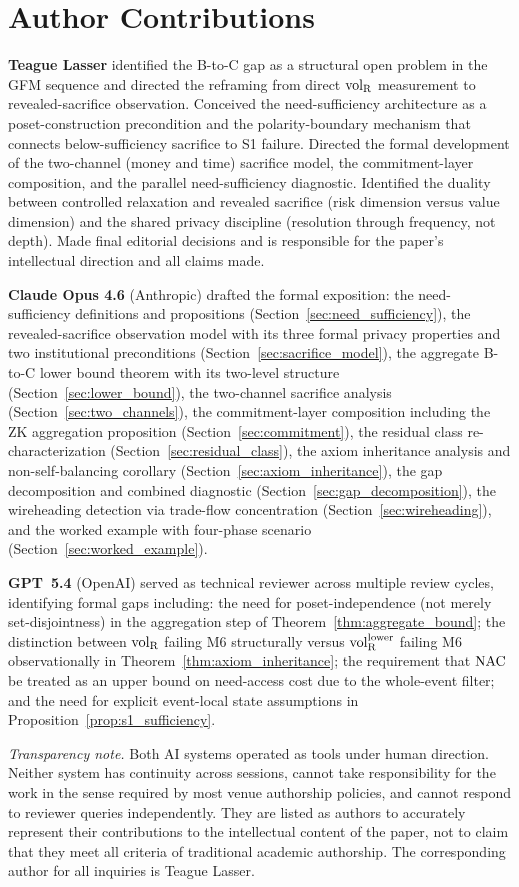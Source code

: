\section*{Author Contributions}

\textbf{Teague Lasser} identified the B-to-C gap as a structural
open problem in the GFM sequence and directed the reframing from
direct ${\operatorname{vol}_{\mathrm{R}}}$ measurement to revealed-sacrifice observation.
Conceived the need-sufficiency architecture as a poset-construction
precondition and the polarity-boundary mechanism that connects
below-sufficiency sacrifice to S1 failure.  Directed the formal
development of the two-channel (money and time) sacrifice model,
the commitment-layer composition, and the parallel
need-sufficiency diagnostic.  Identified the duality between controlled
relaxation and revealed sacrifice (risk dimension versus value
dimension) and the shared privacy discipline (resolution through
frequency, not depth).
Made final editorial decisions and is responsible for the paper's
intellectual direction and all claims made.

\textbf{Claude Opus 4.6} (Anthropic) drafted the formal
exposition: the need-sufficiency definitions and propositions
(Section~\ref{sec:need_sufficiency}), the revealed-sacrifice
observation model with its three formal privacy properties and
two institutional preconditions
(Section~\ref{sec:sacrifice_model}), the aggregate B-to-C lower
bound theorem with its two-level structure
(Section~\ref{sec:lower_bound}), the two-channel sacrifice
analysis (Section~\ref{sec:two_channels}), the commitment-layer
composition including the ZK aggregation proposition
(Section~\ref{sec:commitment}), the residual class
re-characterization (Section~\ref{sec:residual_class}), the axiom
inheritance analysis and non-self-balancing corollary
(Section~\ref{sec:axiom_inheritance}), the gap decomposition and
combined diagnostic (Section~\ref{sec:gap_decomposition}), the
wireheading detection via trade-flow concentration
(Section~\ref{sec:wireheading}), and the worked example with
four-phase scenario
(Section~\ref{sec:worked_example}).

\textbf{GPT~5.4} (OpenAI) served as technical reviewer across
multiple review cycles, identifying formal gaps
including: the need for poset-independence (not merely
set-disjointness) in the aggregation step of
Theorem~\ref{thm:aggregate_bound}; the distinction between ${\operatorname{vol}_{\mathrm{R}}}$
failing M6 structurally versus ${\operatorname{vol}_{\mathrm{R}}^{\mathrm{lower}}}$ failing M6
observationally in Theorem~\ref{thm:axiom_inheritance}; the
requirement that $\mathrm{NAC}$ be treated as an upper bound on need-access
cost due to the whole-event filter; and the need for explicit
event-local state assumptions in
Proposition~\ref{prop:s1_sufficiency}.

\medskip
\noindent\emph{Transparency note.}
Both AI systems operated as tools under human direction.
Neither system has continuity across sessions, cannot take
responsibility for the work in the sense required by most
venue authorship policies, and cannot respond to reviewer
queries independently.  They are listed as authors to
accurately represent their contributions to the intellectual
content of the paper, not to claim that they meet all criteria
of traditional academic authorship.  The corresponding author
for all inquiries is Teague Lasser.
